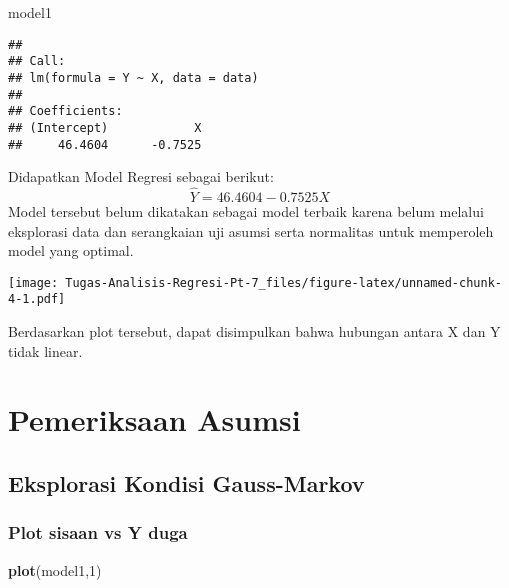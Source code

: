 \documentclass[
]{article}
\newenvironment{Shaded}{\begin{snugshade}}{\end{snugshade}}
\newcommand{\AttributeTok}[1]{\textcolor[rgb]{0.13,0.29,0.53}{#1}}
\newcommand{\DecValTok}[1]{\textcolor[rgb]{0.00,0.00,0.81}{#1}}
\newcommand{\FunctionTok}[1]{\textcolor[rgb]{0.13,0.29,0.53}{\textbf{#1}}}
\newcommand{\NormalTok}[1]{#1}
\newcommand{\SpecialCharTok}[1]{\textcolor[rgb]{0.81,0.36,0.00}{\textbf{#1}}}
\begin{document}
\begin{Shaded}
\begin{Highlighting}[]
\NormalTok{model1}
\end{Highlighting}
\end{Shaded}

\begin{verbatim}
## 
## Call:
## lm(formula = Y ~ X, data = data)
## 
## Coefficients:
## (Intercept)            X  
##     46.4604      -0.7525
\end{verbatim}

Didapatkan Model Regresi sebagai berikut:
\[ \hat Y = 46.4604 - 0.7525X \] Model tersebut belum dikatakan sebagai
model terbaik karena belum melalui eksplorasi data dan serangkaian uji
asumsi serta normalitas untuk memperoleh model yang optimal.

\begin{Shaded}
\end{Shaded}

\texttt{[image: Tugas-Analisis-Regresi-Pt-7\_files/figure-latex/unnamed-chunk-4-1.pdf]}

Berdasarkan plot tersebut, dapat disimpulkan bahwa hubungan antara X dan
Y tidak linear.

\hypertarget{pemeriksaan-asumsi}{%
\section{Pemeriksaan Asumsi}\label{pemeriksaan-asumsi}}

\hypertarget{eksplorasi-kondisi-gauss-markov}{%
\subsection{Eksplorasi Kondisi
Gauss-Markov}\label{eksplorasi-kondisi-gauss-markov}}

\hypertarget{plot-sisaan-vs-y-duga}{%
\subsubsection{Plot sisaan vs Y duga}\label{plot-sisaan-vs-y-duga}}

\begin{Shaded}
\begin{Highlighting}[]
\FunctionTok{plot}\NormalTok{(model1,}\DecValTok{1}\NormalTok{) }
\end{Highlighting}
\end{Shaded}
\end{document}
